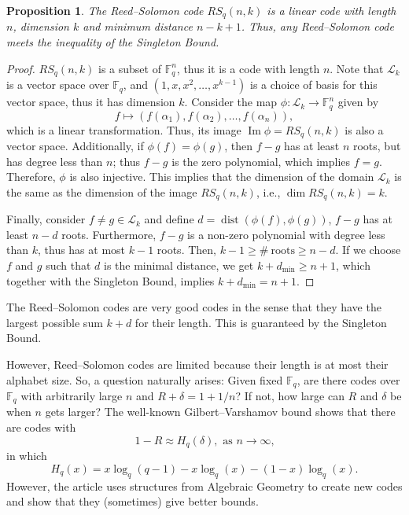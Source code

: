 \documentclass[11pt, oneside]{amsart}
\newtheorem{prop}[thm]{Proposition}
\theoremstyle{definition}
\theoremstyle{remark}
\numberwithin{equation}{section}
\DeclareMathOperator{\dist}{dist}
\DeclareMathOperator{\Ima}{Im}
\DeclareMathOperator{\dimension}{dim}
\begin{document}
\begin{prop}
	The Reed--Solomon code $RS_q(n, k)$ is a linear code with length $n$, dimension $k$ and minimum distance $n - k + 1$.
	Thus, any Reed--Solomon code meets the inequality of the Singleton Bound.
\end{prop}

\begin{proof}
	$RS_q(n, k)$ is a subset of $\mathbb{F}_q^n$, thus it is a code with length $n$.  
	Note that $ \mathcal L_k$ is a vector space over $\mathbb{F}_q$, and $(1, x, x^2, \dots, x^{k-1})$ is a choice of basis for this vector space, thus it has dimension $k$.
	Consider the map $\phi:  \mathcal L_k \to \mathbb{F}_q^n$ given by 
	\begin{equation}
		f \mapsto (f(\alpha_1), f(\alpha_2), \dots, f(\alpha_n)),
	\end{equation}
	which is a linear transformation.
	Thus, its image $\Ima \phi = RS_q(n, k)$ is also a vector space.  
	Additionally, if $\phi(f) = \phi(g)$, then $f - g$ has at least $n$ roots, but has degree less than $n$; thus $f - g$ is the zero polynomial, which implies $f = g$.
	Therefore, $\phi$ is also injective.
	This implies that the dimension of the domain $ \mathcal L_k$ is the same as the dimension of the image $RS_q(n, k)$, i.e.,  $\dimension RS_q(n, k) = k$.
	
	Finally, consider $f \neq g \in  \mathcal L_k$ and define $d = \dist(\phi(f), \phi(g))$, $f - g$ has at least $n - d$ roots.
	Furthermore, $f - g$ is a non-zero polynomial with degree less than $k$, thus has at most $k - 1$ roots.
	Then,  $ k - 1 \ge \#\ \text{roots} \ge n - d$.
	If we choose $f$ and $g$ such that $d$ is the minimal distance, we get $k + d_{\mathrm{min}} \ge n + 1$, which together with the Singleton Bound, implies $k + d_\text{min} = n + 1$.
\end{proof}

The Reed--Solomon codes are very good codes in the sense that they have the largest possible sum $k + d$ for their length.
This is guaranteed by the Singleton Bound.

However, Reed--Solomon codes are limited because their length is at most their alphabet size.
So, a question naturally arises: Given fixed $\mathbb{F}_q$, are there codes over $\mathbb{F}_q$ with arbitrarily large $n$ and $R + \delta = 1 + 1/n$?
If not, how large can $R$ and $\delta$ be when $n$ gets larger?
The well-known Gilbert--Varshamov bound shows that there are codes with 
\begin{equation}
	1 - R \approx H_q(\delta), \text{ as $n \to \infty$,}
\end{equation}
in which
\begin{equation}
	H_q(x) = x \log_q(q-1) - x\log_q(x) - (1-x)\log_q(x).
\end{equation}
However, the article \cite{TVZ82} uses structures from Algebraic Geometry to create new codes and show that they (sometimes) give better bounds.
\end{document}
